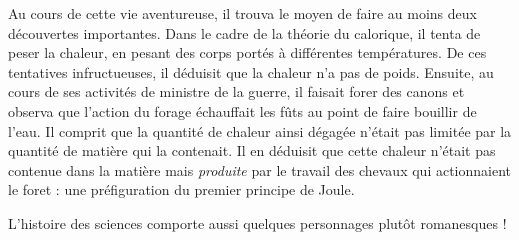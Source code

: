 	Au cours de cette vie aventureuse, il trouva le moyen de faire au moins deux découvertes importantes. Dans le cadre de la théorie du calorique, il tenta de peser la chaleur, en pesant des corps portés à différentes températures. De ces  tentatives infructueuses, il déduisit que la chaleur n'a pas de poids. Ensuite, au cours de ses activités de ministre de la guerre, il faisait forer des canons et observa que l'action du forage échauffait les fûts au point de faire bouillir de l'eau. Il comprit que la quantité de chaleur ainsi dégagée n'était pas limitée par la quantité de matière qui la contenait. Il en déduisit que cette chaleur n'était pas contenue dans la matière mais \emph{produite} par le travail des chevaux qui actionnaient le foret : une préfiguration du premier principe de Joule. 

	L'histoire des sciences comporte aussi quelques personnages plutôt romanesques !

\atendofhistorysection

